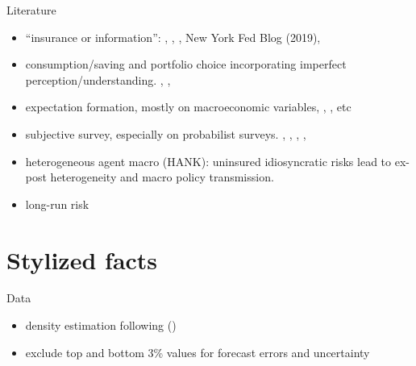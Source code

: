 \documentclass{beamer}
\begin{document}
\begin{frame}{Literature}
\begin{itemize}
	\item ``insurance or information'':  \cite{kaufmann_disentangling_2009},  \cite{meghir2011earnings}, \cite{pistaferri_superior_2001}, New York Fed Blog (2019),  \cite{flavin_excess_1988}
   \item consumption/saving and portfolio choice incorporating imperfect perception/understanding. \cite{rozsypal_overpersistence_2017}, \cite{carroll_sticky_2018}, \cite{lian2019imperfect}
   \item expectation formation, mostly on macroeconomic variables, \cite{coibion2012can}, \cite{fuhrer2018intrinsic}, etc
   \item subjective survey, especially on probabilist surveys.  \cite{manski_measuring_2004}, \cite{delavande2011measuring}, \cite{manski_survey_2018},  \cite{bertrand_people_2001}, \cite{armantier_overview_2017}
   \item heterogeneous agent macro (HANK): uninsured idiosyncratic risks lead to ex-post heterogeneity and macro policy transmission. \cite{xxx}
   \item long-run risk \cite{xxx} 
  \end{itemize}
\end{frame}

\section{Stylized facts}


\begin{frame}{Data}
	\begin{table}
		\centering
		\caption{Survey of Consumer Expectations}
		\label{SCE_data_sum}
	\end{table}
	\begin{itemize}
		\item density estimation following (\cite{engelberg_comparing_2009})
		\item exclude top and bottom 3\% values for forecast errors and uncertainty
	\end{itemize}
\end{frame}
\end{document}
